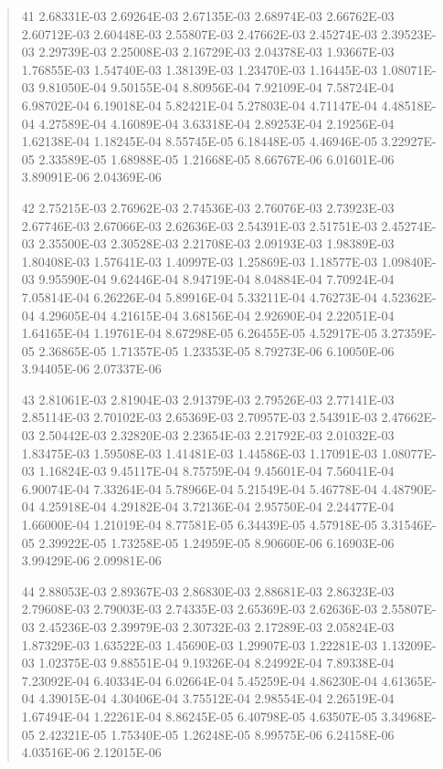 \documentclass[letterpaper,10pt,english]{sphinxmanual}
\begin{document}
\begin{quote}
\begin{DUlineblock}{0em}
\item[] 41   2.68331E-03  2.69264E-03  2.67135E-03  2.68974E-03  2.66762E-03  2.60712E-03  2.60448E-03  2.55807E-03  2.47662E-03  2.45274E-03  2.39523E-03  2.29739E-03  2.25008E-03  2.16729E-03  2.04378E-03  1.93667E-03  1.76855E-03  1.54740E-03  1.38139E-03  1.23470E-03  1.16445E-03  1.08071E-03  9.81050E-04  9.50155E-04  8.80956E-04  7.92109E-04  7.58724E-04  6.98702E-04  6.19018E-04  5.82421E-04  5.27803E-04  4.71147E-04  4.48518E-04  4.27589E-04  4.16089E-04  3.63318E-04  2.89253E-04  2.19256E-04  1.62138E-04  1.18245E-04  8.55745E-05  6.18448E-05  4.46946E-05  3.22927E-05  2.33589E-05  1.68988E-05  1.21668E-05  8.66767E-06  6.01601E-06  3.89091E-06  2.04369E-06
\item[] 42   2.75215E-03  2.76962E-03  2.74536E-03  2.76076E-03  2.73923E-03  2.67746E-03  2.67066E-03  2.62636E-03  2.54391E-03  2.51751E-03  2.45274E-03  2.35500E-03  2.30528E-03  2.21708E-03  2.09193E-03  1.98389E-03  1.80408E-03  1.57641E-03  1.40997E-03  1.25869E-03  1.18577E-03  1.09840E-03  9.95590E-04  9.62446E-04  8.94719E-04  8.04884E-04  7.70924E-04  7.05814E-04  6.26226E-04  5.89916E-04  5.33211E-04  4.76273E-04  4.52362E-04  4.29605E-04  4.21615E-04  3.68156E-04  2.92690E-04  2.22051E-04  1.64165E-04  1.19761E-04  8.67298E-05  6.26455E-05  4.52917E-05  3.27359E-05  2.36865E-05  1.71357E-05  1.23353E-05  8.79273E-06  6.10050E-06  3.94405E-06  2.07337E-06
\item[] 43   2.81061E-03  2.81904E-03  2.91379E-03  2.79526E-03  2.77141E-03  2.85114E-03  2.70102E-03  2.65369E-03  2.70957E-03  2.54391E-03  2.47662E-03  2.50442E-03  2.32820E-03  2.23654E-03  2.21792E-03  2.01032E-03  1.83475E-03  1.59508E-03  1.41481E-03  1.44586E-03  1.17091E-03  1.08077E-03  1.16824E-03  9.45117E-04  8.75759E-04  9.45601E-04  7.56041E-04  6.90074E-04  7.33264E-04  5.78966E-04  5.21549E-04  5.46778E-04  4.48790E-04  4.25918E-04  4.29182E-04  3.72136E-04  2.95750E-04  2.24477E-04  1.66000E-04  1.21019E-04  8.77581E-05  6.34439E-05  4.57918E-05  3.31546E-05  2.39922E-05  1.73258E-05  1.24959E-05  8.90660E-06  6.16903E-06  3.99429E-06  2.09981E-06
\item[] 44   2.88053E-03  2.89367E-03  2.86830E-03  2.88681E-03  2.86323E-03  2.79608E-03  2.79003E-03  2.74335E-03  2.65369E-03  2.62636E-03  2.55807E-03  2.45236E-03  2.39979E-03  2.30732E-03  2.17289E-03  2.05824E-03  1.87329E-03  1.63522E-03  1.45690E-03  1.29907E-03  1.22281E-03  1.13209E-03  1.02375E-03  9.88551E-04  9.19326E-04  8.24992E-04  7.89338E-04  7.23092E-04  6.40334E-04  6.02664E-04  5.45259E-04  4.86230E-04  4.61365E-04  4.39015E-04  4.30406E-04  3.75512E-04  2.98554E-04  2.26519E-04  1.67494E-04  1.22261E-04  8.86245E-05  6.40798E-05  4.63507E-05  3.34968E-05  2.42321E-05  1.75340E-05  1.26248E-05  8.99575E-06  6.24158E-06  4.03516E-06  2.12015E-06

\end{DUlineblock}
\end{quote}
\end{document}
